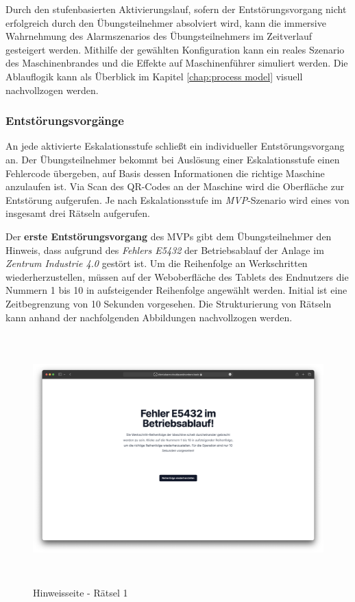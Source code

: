 Durch den stufenbasierten Aktivierungslauf, sofern der Entstörungsvorgang nicht erfolgreich durch den Übungsteilnehmer absolviert wird, kann die immersive Wahrnehmung des Alarmszenarios des Übungsteilnehmers im Zeitverlauf gesteigert werden. Mithilfe der gewählten Konfiguration kann ein reales Szenario des Maschinenbrandes und die Effekte auf Maschinenführer simuliert werden. Die Ablauflogik kann als Überblick im Kapitel \ref{chap:process model} visuell nachvollzogen werden.

\subsubsection{Entstörungsvorgänge}

An jede aktivierte Eskalationsstufe schließt ein individueller Entstörungsvorgang an. Der Übungsteilnehmer bekommt bei Auslösung einer Eskalationsstufe einen Fehlercode übergeben, auf Basis dessen Informationen die richtige Maschine anzulaufen ist. Via Scan des QR-Codes an der Maschine wird die Oberfläche zur Entstörung aufgerufen. Je nach Eskalationsstufe im \textit{MVP}-Szenario wird eines von insgesamt drei Rätseln aufgerufen.

Der \textbf{erste Entstörungsvorgang} des MVPs gibt dem Übungsteilnehmer den Hinweis, dass aufgrund des \textit{Fehlers E5432} der Betriebsablauf der Anlage im \textit{Zentrum Industrie 4.0} gestört ist. Um die Reihenfolge an Werkschritten wiederherzustellen, müssen auf der Weboberfläche des Tablets des Endnutzers die Nummern 1 bis 10 in aufsteigender Reihenfolge angewählt werden. Initial ist eine Zeitbegrenzung von 10 Sekunden vorgesehen. Die Strukturierung von Rätseln kann anhand der nachfolgenden Abbildungen nachvollzogen werden.

\begin{figure}[H]
   \includegraphics[width=15cm, height=9.61cm]{res/quest_01_v2.png}
   \caption{Hinweisseite - Rätsel 1}
\end{figure}

